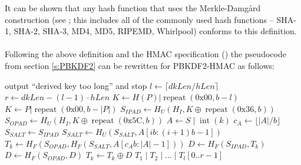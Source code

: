\documentclass[12pt,oneside]{fithesis2}
\begin{document}
      It can be shown that any hash function that uses the Merkle-Damgård construction (see \cite[p. 333]{handbook}; this includes all of the commonly used hash functions -- SHA-1, SHA-2, SHA-3, MD4, MD5, RIPEMD, Whirlpool) conforms to this definition.
      
      \paragraph*{}
      Following the above definition and the HMAC specification (\cite{rfc2104}) the pseudocode from section \ref{s:PBKDF2} can be rewritten for PBKDF2-HMAC as follows:
      \begin{algorithmic}[1]
            \State output ``derived key too long'' and stop
          \EndIf
          \State $l \gets \lceil dkLen / hLen\rceil$ 
          \State $r \gets dkLen - (l - 1) \cdot hLen$ 
          \State {}
            \State $K \gets H(P)|\operatorname{repeat}(\text{0x00}, b - l)$
          \Else
            \State $K \gets P|\operatorname{repeat}(\text{0x00}, b - |P|)$
          \EndIf
          \State {}
          \State $S_{IPAD} \gets H_U(H_I, K \oplus \operatorname{repeat}(\text{0x36}, b))$
          \State $S_{OPAD} \gets H_U(H_I, K \oplus \operatorname{repeat}(\text{0x5C}, b))$
           \label{dkLoop:from}
            \State {}
            \State $A \gets S \mid \operatorname{int}(k)$
            \State $c_A \gets \lfloor |A| / b \rfloor$
            \State $S_{SALT} \gets S_{IPAD}$
              \State $S_{SALT} \gets H_U(S_{SALT}, A[ib:(i+1)b-1])$
            \EndFor
            \State $T_k \gets H_F(S_{OPAD}, H_F(S_{SALT}, A[c_Ab:|A|-1]))$
            \State {}
             \label{mainLoop:from}
              \State $D \gets H_F(S_{IPAD}, T_k)$
              \State $D \gets H_F(S_{OPAD}, D)$
              \State $T_k \gets T_k \oplus D$
            \EndFor \label{mainLoop:to}
          \EndFor \label{dkLoop:to}
          \State \Return $T_1 \mid T_2 \mid ... \mid T_l[0..r - 1]$
        \EndFunction
      \end{algorithmic}
      
\end{document}
